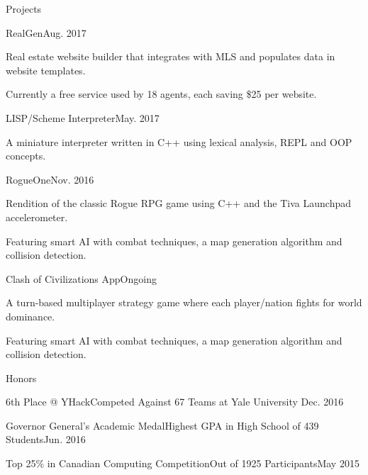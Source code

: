 \documentclass{resume} %
\begin{document}
\begin{rSection}{Projects}

\begin{projSec}{RealGen}{Aug. 2017}
\item Real estate website builder that integrates with MLS and populates data in website templates.
\item Currently a free service used by 18 agents, each saving \$25 per website.
\end{projSec}

\begin{projSec}{LISP/Scheme Interpreter}{May. 2017}
\item A miniature interpreter written in C++ using lexical analysis, REPL and OOP concepts.
\end{projSec}

\begin{projSec}{RogueOne}{Nov. 2016}
\item Rendition of the classic Rogue RPG game using C++ and the Tiva Launchpad accelerometer.
\item Featuring smart AI with combat techniques, a map generation algorithm and collision detection.
\end{projSec}

\begin{projSec}{Clash of Civilizations App}{Ongoing}
\item A turn-based multiplayer strategy game where each player/nation fights for world dominance.
\item Featuring smart AI with combat techniques, a map generation algorithm and collision detection.
\end{projSec}


\end{rSection}


\begin{rSection}{Honors}

\begin{honorSec}{6th Place @ YHack}{Competed Against 67 Teams at Yale University }{Dec. 2016}\end{honorSec}
\begin{honorSec}{Governor General's Academic Medal}{Highest GPA in High School of 439 Students}{Jun. 2016}\end{honorSec}
\begin{honorSec}{Top 25\% in Canadian Computing Competition}{Out of 1925 Participants}{May 2015}\end{honorSec}
\vspace{1em} 

\end{rSection}
\end{document}

